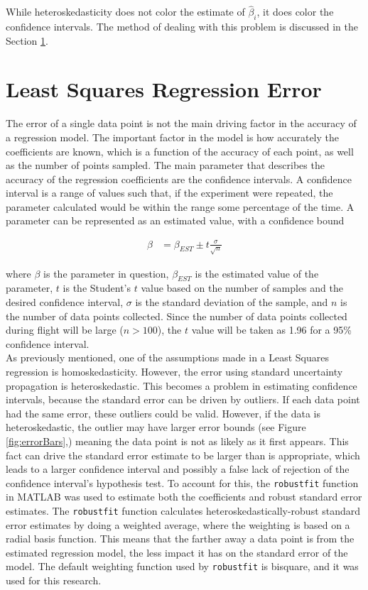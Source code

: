 While heteroskedasticity does not color the estimate of $\hat{\beta}_i$, it does color the confidence intervals. The method of dealing with this problem is discussed in the Section \ref{sect:lsError}.

\section{Least Squares Regression Error}
\label{sect:lsError}
The error of a single data point is not the main driving factor in the accuracy of a regression model. The important factor in the model is how accurately the coefficients are known, which is a function of the accuracy of each point, as well as the number of points sampled. The main parameter that describes the accuracy of the regression coefficients are the confidence intervals. A confidence interval is a range of values such that, if the experiment were repeated, the parameter calculated would be within the range some percentage of the time. A parameter can be represented as an estimated value, with a confidence bound

\begin{align}
\label{confidenceInterval}
\beta &= \beta_{EST} \pm t\frac{\sigma}{\sqrt{n}}
\end{align}

where $\beta$ is the parameter in question, $\beta_{EST}$ is the estimated value of the parameter, $t$ is the Student's $t$ value based on the number of samples and the desired confidence interval, $\sigma$ is the standard deviation of the sample, and $n$ is the number of data points collected. Since the number of data points collected during flight will be large ($n>100$), the $t$ value will be taken as 1.96 for a 95\% confidence interval.\\
As previously mentioned, one of the assumptions made in a Least Squares regression is homoskedasticity. However, the error using standard uncertainty propagation is heteroskedastic. This becomes a problem in estimating confidence intervals, because the standard error can be driven by outliers. If each data point had the same error, these outliers could be valid. However, if the data is heteroskedastic, the outlier may have larger error bounds (see Figure \ref{fig:errorBars},) meaning the data point is not as likely as it first appears. This fact can drive the standard error estimate to be larger than is appropriate, which leads to a larger confidence interval and possibly a false lack of rejection of the confidence interval's hypothesis test. To account for this, the \texttt{robustfit} function in MATLAB  was used to estimate both the coefficients and robust standard error estimates. The \texttt{robustfit} function calculates heteroskedastically-robust standard error estimates by doing a weighted average, where the weighting is based on a radial basis function. This means that the farther away a data point is from the estimated regression model, the less impact it has on the standard error of the model. The default weighting function used by \texttt{robustfit} is bisquare, and it was used for this research.

